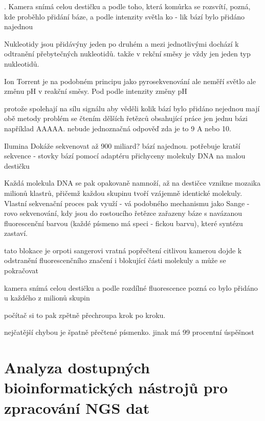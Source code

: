 \documentclass[czech,DP]{thesiskiv}
\begin{document}
. Kamera
snímá celou destičku a podle toho, která
komůrka se rozsvítí, pozná, kde proběhlo
přidání báze, a podle intenzity světla ko -
lik bází bylo přidáno najednou

Nukleotidy jsou přidávýny jeden po druhém a mezi jednotlivými dochází k odtranění přebytečných nukleotidů.
takže v rekční směsy je vždy jen jeden typ nukleotidů.


Ion Torrent je na podobném principu jako pyrosekvenování
ale neměří světlo ale změnu pH v reakční směsy. Pod
podle intenzity změny pH

protože spolehají na sílu signálu aby věděli kolik bází bylo přidáno  nejednou mají obě metody problém se čtením dělších řetězců obsahující práce jen jednu bázi například AAAAA. nebude jednoznačná odpověď zda je to 9 A nebo 10.

Ilumina
Dokáže sekvenovat až 900 miliard? bází najednou. 
potřebuje kratší sekvence - stovky bází
pomocí adaptéru přichyceny molekuly DNA na malou destičku

Každá molekula DNA se pak opakovaně namnoží, až na destičce vznikne
mozaika milionů klastrů, přičemž každou
skupinu tvoří vzájemně identické molekuly. Vlastní sekvenační proces pak využí -
vá podobného mechanismu jako Sange -
rovo sekvenování, kdy jsou do rostoucího
řetězce zařazeny báze s navázanou fluorescenční barvou (každé písmeno má speci -
fickou barvu), které syntézu zastaví.

tato blokace je orpoti sangerovi vratná
 popřečtení citlivou kamerou dojde k odstranění fluorescenčního značení i blokující části molekuly
 a může se pokračovat
 
 kamera snímá celou destičku
 a podle rozdílné fluorescence pozná co bylo přidáno u každého z milionů skupin
 
 počítač si to pak zpětně přechroupa krok po kroku.
 

nejčatější chybou je špatně přečtené písmenko. 
jinak má 99 procentní úspěšnost

\chapter{Analyza dostupných bioinformatických nástrojů pro zpracování NGS dat}
\end{document}
